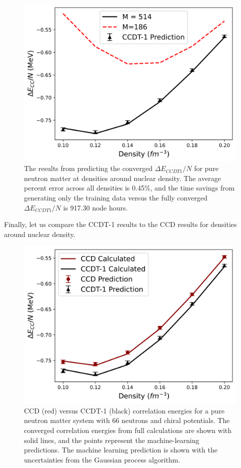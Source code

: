 \begin{figure}
  \centering
  \includegraphics[scale=0.5]{Images/Chapter7/ORNL/ccdt1_nuclear_neutron_matter_with_training.png}
  \caption{The results from predicting the converged $\Delta E_{CCDT1}/N$ for pure neutron matter at densities around nuclear density.  The average percent error across all densities is 0.45$\%$, and the time savings from generating only the training data versus the fully converged $\Delta E_{CCDT1}/N$ is 917.30 node hours.}  \label{fig:ccdt1_nuclear_density}
\end{figure}

Finally, let us compare the CCDT-1 results to the CCD results for densities around nuclear density.

\begin{figure}
    \centering
\includegraphics{Images/Chapter7/ORNL/ccdt1_nuclear_neutron_matter.png}
    \caption{CCD (red) versus CCDT-1 (black) correlation energies for a pure neutron matter system with 66 neutrons and chiral potentials. The converged correlation energies from full calculations are shown with solid lines, and the points represent the machine-learning predictions. The machine learning prediction is shown with the uncertainties from the Gaussian process algorithm.}
    \label{fig:ccd_and_ccddt1}
\end{figure}
